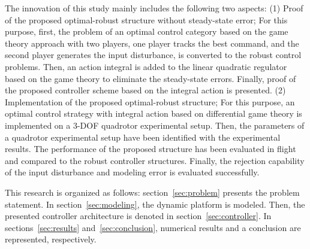 \documentclass[3p]{elsarticle}
\begin{document}
The innovation of this study mainly includes the following two aspects: (1) Proof of the proposed optimal-robust structure without steady-state error; For this purpose, first, the problem of an optimal control category based on the game theory approach with two players, one player tracks the best command, and the second player generates the input disturbance, is converted to the robust control problems. Then, an action integral is added to the linear quadratic regulator based on the game theory to eliminate the steady-state errors. Finally, proof of the proposed controller scheme based on the integral action is presented. (2) Implementation of the proposed optimal-robust structure; For this purpose, an optimal control strategy with integral action based on differential game theory is implemented on a 3-DOF quadrotor experimental setup. Then, the parameters of a quadrotor experimental setup have been identified with the experimental results. The performance of the proposed structure has been evaluated in flight and compared to the robust controller structures. Finally, the rejection capability of the input disturbance and modeling error is evaluated successfully.


This research is organized as follows: section~\ref{sec:problem} presents the problem statement.
In section~\ref{sec:modeling}, the dynamic platform is modeled. Then, the presented controller architecture is denoted in section~\ref{sec:controller}. 
In sections~\ref{sec:results} and~\ref{sec:conclusion}, numerical results and a conclusion are represented, respectively.
\end{document}
